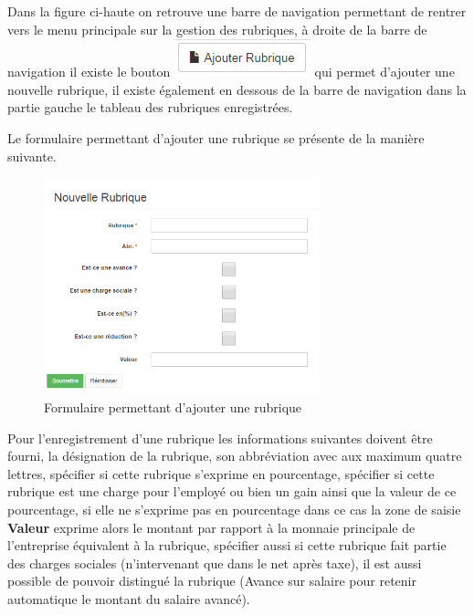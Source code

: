 \documentclass[12pt,a4paper]{report}
\begin{document}
Dans la figure ci-haute on retrouve une barre de navigation permettant de rentrer vers le menu principale sur la gestion des rubriques, à droite de la barre de navigation il existe le bouton \includegraphics[scale=1]{pic/AddRubriques.png} qui permet d'ajouter une nouvelle rubrique, il existe également en dessous de la barre de navigation dans la partie gauche le tableau des rubriques enregistrées.

Le formulaire permettant d'ajouter une rubrique se présente de la manière suivante. 

\begin{figure}[h]
\begin{center}
\includegraphics[width=8cm]{pic/NewRubric.png}
\end{center}
\caption{Formulaire permettant d'ajouter une rubrique}
\label{Formulaire permettant d'ajouter une rubrique}
\end{figure} 

Pour l'enregistrement d'une rubrique les informations suivantes doivent être fourni, la désignation de la rubrique, son abbréviation avec aux maximum quatre lettres, spécifier si cette rubrique s'exprime en pourcentage, spécifier si cette rubrique est une charge pour l'employé ou bien un gain ainsi que la valeur de ce pourcentage, si elle ne s'exprime pas en pourcentage dans ce cas la zone de saisie \textbf{Valeur} exprime alors le montant par rapport à la monnaie principale de l'entreprise équivalent à la rubrique, spécifier aussi si cette rubrique fait partie des charges sociales (n'intervenant que dans le net après taxe), il est aussi possible de pouvoir distingué la rubrique (Avance sur salaire pour retenir automatique le montant du salaire avancé). 
\end{document}
